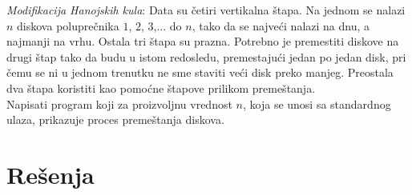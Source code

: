 \begin{Exercise}[difficulty=1, label=1_37]%
{\em Modifikacija Hanojskih kula}: Data su četiri
  vertikalna štapa. Na jednom se nalazi $n$ diskova poluprečnika
  $1$, $2$, $3$,... do $n$, tako da se najveći nalazi na dnu, a
  najmanji na vrhu. Ostala tri štapa su prazna. Potrebno je
  premestiti diskove na drugi štap tako da budu u istom redosledu,
  premestajući jedan po jedan disk, pri čemu se ni u jednom
  trenutku ne sme staviti veći disk preko manjeg. Preostala dva 
  štapa koristiti kao pomoćne štapove prilikom
  premeštanja.\\
  Napisati program koji za proizvoljnu vrednost $n$, koja se unosi sa standardnog ulaza, prikazuje proces premeštanja diskova.

\end{Exercise}

\section{Rešenja}
\shipoutAnswer
